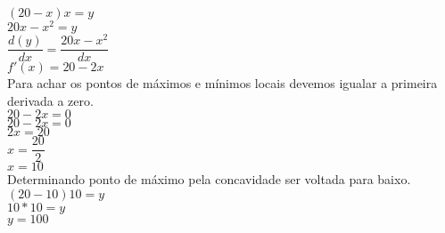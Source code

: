 \documentclass[12pt,a4paper]{article}
\begin{document}
	\begin{center}
		$(20-x)x = y$\\ 
		\vspace{0.25cm}
		$20x - x^{2} = y$\\
		\vspace{0.25cm}
		$\dfrac{d(y)}{dx} = \dfrac{20x - x^{2}}{dx}$\\
		\vspace{0.25cm}
		$f'(x) = 20 - 2x$\\
		\vspace{0.5cm}
		Para achar os pontos de máximos e mínimos locais devemos igualar a primeira derivada a zero.\\
		\vspace{0.5cm}
		$20 - 2x = 0$\\
		\vspace{0.25cm}
		$20 - 2x = 0$\\
		\vspace{0.25cm}
		$2x = 20$\\
		\vspace{0.25cm}
		$x = \dfrac{20}{2}$\\
		\vspace{0.25cm}
		$x = 10$\\
		\vspace{0.5cm}
		Determinando ponto de máximo pela concavidade ser voltada para baixo.\\
		\vspace{0.5cm}
		$(20-10)10 = y$\\
		\vspace{0.25cm}
		$10 * 10 = y$\\
		\vspace{0.25cm}
		$y = 100$
	\end{center}
\end{document}
